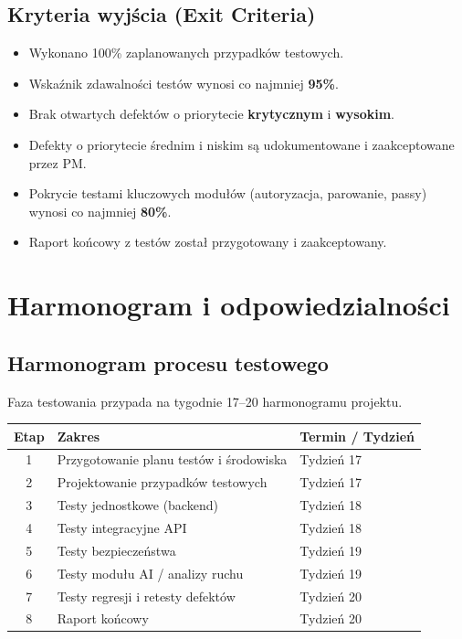 \documentclass[11pt,a4paper]{article}
\begin{document}
\subsection{Kryteria wyjścia (Exit Criteria)}
\begin{itemize}
  \item Wykonano 100\% zaplanowanych przypadków testowych.
  \item Wskaźnik zdawalności testów wynosi co najmniej \textbf{95\%}.
  \item Brak otwartych defektów o priorytecie \textbf{krytycznym} i \textbf{wysokim}.
  \item Defekty o priorytecie średnim i niskim są udokumentowane i zaakceptowane przez PM.
  \item Pokrycie testami kluczowych modułów (autoryzacja, parowanie, passy) wynosi co najmniej \textbf{80\%}.
  \item Raport końcowy z testów został przygotowany i zaakceptowany.
\end{itemize}

\section{Harmonogram i odpowiedzialności}

\subsection{Harmonogram procesu testowego}
Faza testowania przypada na tygodnie 17–20 harmonogramu projektu.

\begin{longtable}{c p{} p{}}
\toprule
\textbf{Etap} & \textbf{Zakres} & \textbf{Termin / Tydzień} \\
\midrule
\endhead
1 & Przygotowanie planu testów i środowiska & Tydzień 17 \\
2 & Projektowanie przypadków testowych & Tydzień 17 \\
3 & Testy jednostkowe (backend) & Tydzień 18 \\
4 & Testy integracyjne API & Tydzień 18 \\
5 & Testy bezpieczeństwa & Tydzień 19 \\
6 & Testy modułu AI / analizy ruchu & Tydzień 19 \\
7 & Testy regresji i retesty defektów & Tydzień 20 \\
8 & Raport końcowy & Tydzień 20 \\
\bottomrule
\end{longtable}
\end{document}
